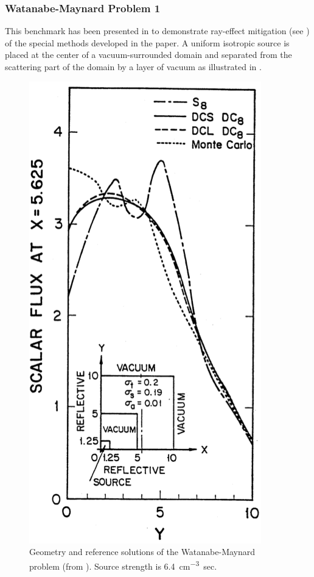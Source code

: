 \subsubsection{Watanabe-Maynard Problem 1}\label{sec:wm1}
This benchmark has been presented in \cite{watanabe} to demonstrate ray-effect mitigation (see )
of the special methods developed in the paper. A uniform isotropic source is placed at the center of a
vacuum-surrounded domain and separated from the scattering part of the domain by a layer of vacuum as illustrated in
. 

\begin{figure}[!htb]
\centering
  \includegraphics[scale=.4]{wm1/WM}
  \caption[Watanabe-Maynard problem]{Geometry and reference solutions of the Watanabe-Maynard problem (from
  \cite{watanabe}). Source strength is \SI{6.4}{cm^{-3}.sec}.}
  \label{fig:20}
\end{figure}


